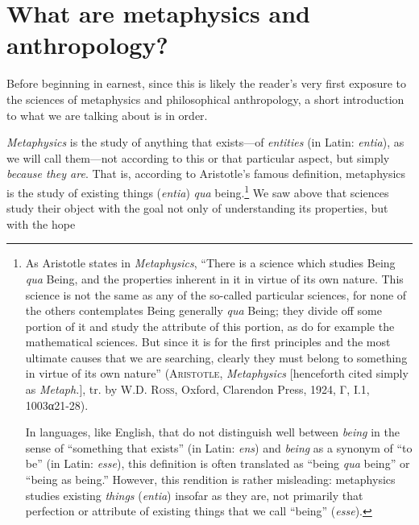 \documentclass[article,12pt,a4paper,oneside]{memoir}
\begin{document}
    \hypertarget{what-are-metaphysics-and-anthropology}{%
    \section{What are metaphysics and
    anthropology?}\label{what-are-metaphysics-and-anthropology}}

    Before beginning in earnest, since this is likely the reader's very
    first exposure to the sciences of metaphysics and philosophical
    anthropology, a short introduction to what we are talking about is
    in order.

    \emph{Metaphysics} is the study of anything that exists---of
    \emph{entities} (in Latin: \emph{entia}), as we will call them---not
    according to this or that particular aspect, but simply
    \emph{because they are}. That is, according to Aristotle's famous
    definition, metaphysics is the study of existing things
    (\emph{entia}) \emph{qua} being.\footnote{As Aristotle states in
      \emph{Metaphysics}, ``There is a science which studies Being
      \emph{qua} Being, and the properties inherent in it in virtue of
      its own nature. This science is not the same as any of the
      so-called particular sciences, for none of the others contemplates
      Being generally \emph{qua} Being; they divide off some portion of
      it and study the attribute of this portion, as do for example the
      mathematical sciences. But since it is for the first principles
      and the most ultimate causes that we are searching, clearly they
      must belong to something in virtue of its own nature''
      (\textsc{Aristotle}, \emph{Metaphysics} {[}henceforth cited simply
      as \emph{Metaph.}{]}, tr. by \textsc{W.D. Ross}, Oxford, Clarendon
      Press, 1924, Γ, I.1, 1003α21-28).

      \par

      In languages, like English, that do not distinguish well between
      \emph{being} in the sense of ``something that exists'' (in Latin:
      \emph{ens}) and \emph{being} as a synonym of ``to be'' (in Latin:
      \emph{esse}), this definition is often translated as ``being
      \emph{qua} being'' or ``being as being.'' However, this rendition
      is rather misleading: metaphysics studies existing \emph{things}
      (\emph{entia}) insofar as they are, not primarily that perfection
      or attribute of existing things that we call ``being''
      (\emph{esse}).} We saw above that sciences study their object with
    the goal not only of understanding its properties, but with the hope
\end{document}
